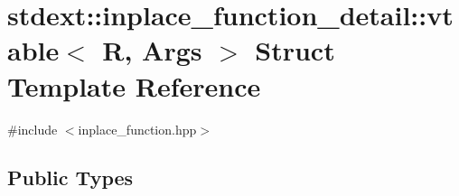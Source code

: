 \hypertarget{structstdext_1_1inplace__function__detail_1_1vtable}{}\section{stdext\+:\+:inplace\+\_\+function\+\_\+detail\+:\+:vtable$<$ R, Args $>$ Struct Template Reference}
\label{structstdext_1_1inplace__function__detail_1_1vtable}


{\ttfamily \#include $<$inplace\+\_\+function.\+hpp$>$}

\subsection*{Public Types}
